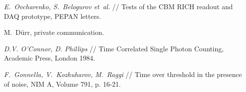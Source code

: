\begin{thebibliography}{99}
\textit{E.~Ovcharenko, S.~Belogurov et~al.} //
Tests of the CBM RICH readout and DAQ prototype,
PEPAN letters.

M.~D\"urr, private communication.

\textit{D.V. O’Connor, D. Phillips} //
Time Correlated Single Photon Counting, Academic Press, London 1984.

\textit{F.~Gonnella, V.~Kozhuharov, M.~Raggi} //
Time over threshold in the presence of noise,
NIM A, Volume 791, p. 16-21.

\end{thebibliography}

